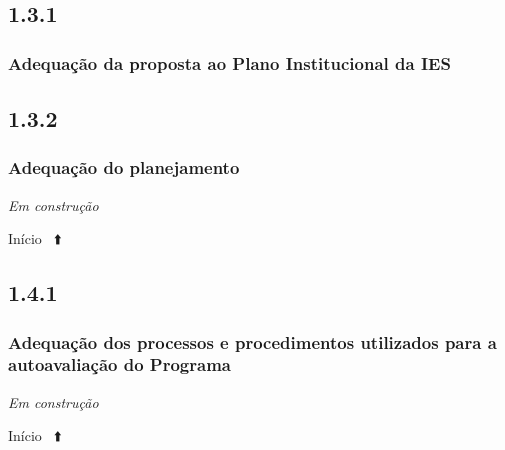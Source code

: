 \documentclass[
  a4paper,
]{book}
\begin{document}
\hypertarget{section-8}{%
\subsection{\texorpdfstring{\textbf{1.3.1}}{1.3.1}}\label{section-8}}

\hypertarget{adequauxe7uxe3o-da-proposta-ao-plano-institucional-da-ies}{%
\subsubsection{\texorpdfstring{\textbf{Adequação da proposta ao Plano Institucional da IES}}{Adequação da proposta ao Plano Institucional da IES}}\label{adequauxe7uxe3o-da-proposta-ao-plano-institucional-da-ies}}

\hypertarget{section-9}{%
\subsection{\texorpdfstring{\textbf{1.3.2}}{1.3.2}}\label{section-9}}

\hypertarget{adequauxe7uxe3o-do-planejamento}{%
\subsubsection{\texorpdfstring{\textbf{Adequação do planejamento}}{Adequação do planejamento}}\label{adequauxe7uxe3o-do-planejamento}}

\emph{Em construção}

Início ~⬆️

\hypertarget{section-10}{%
\subsection{\texorpdfstring{\textbf{1.4.1}}{1.4.1}}\label{section-10}}

\hypertarget{adequauxe7uxe3o-dos-processos-e-procedimentos-utilizados-para-a-autoavaliauxe7uxe3o-do-programa}{%
\subsubsection{\texorpdfstring{\textbf{Adequação dos processos e procedimentos utilizados para a autoavaliação do Programa}}{Adequação dos processos e procedimentos utilizados para a autoavaliação do Programa}}\label{adequauxe7uxe3o-dos-processos-e-procedimentos-utilizados-para-a-autoavaliauxe7uxe3o-do-programa}}

\emph{Em construção}

Início ~⬆️
\end{document}
